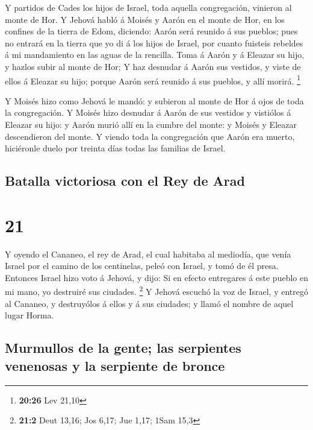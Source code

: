 Y partidos de Cades los hijos de Israel, toda aquella
congregación, vinieron al monte de Hor.  Y Jehová habló á
Moisés y Aarón en el monte de Hor, en los confines de la tierra de Edom,
diciendo:  Aarón será reunido á sus pueblos; pues no
entrará en la tierra que yo di á los hijos de Israel, por cuanto
fuisteis rebeldes á mi mandamiento en las aguas de la rencilla.
 Toma á Aarón y á Eleazar su hijo, y hazlos subir al
monte de Hor;  Y haz desnudar á Aarón sus vestidos, y
viste de ellos á Eleazar su hijo; porque Aarón será reunido á sus
pueblos, y allí morirá. \footnote{\textbf{20:26} Lev 21,10}

 Y Moisés hizo como Jehová le mandó: y subieron al monte
de Hor á ojos de toda la congregación.  Y Moisés hizo
desnudar á Aarón de sus vestidos y vistiólos á Eleazar su hijo: y Aarón
murió allí en la cumbre del monte: y Moisés y Eleazar descendieron del
monte.  Y viendo toda la congregación que Aarón era
muerto, hiciéronle duelo por treinta días todas las familias de Israel.

\hypertarget{batalla-victoriosa-con-el-rey-de-arad}{%
\subsection{Batalla victoriosa con el Rey de
Arad}\label{batalla-victoriosa-con-el-rey-de-arad}}

\hypertarget{section-20}{%
\section{21}\label{section-20}}

 Y oyendo el Cananeo, el rey de Arad, el cual habitaba al
mediodía, que venía Israel por el camino de los centinelas, peleó con
Israel, y tomó de él presa.  Entonces Israel hizo voto á
Jehová, y dijo: Si en efecto entregares á este pueblo en mi mano, yo
destruiré sus ciudades. \footnote{\textbf{21:2} Deut 13,16; Jos 6,17;
  Jue 1,17; 1Sam 15,3}  Y Jehová escuchó la voz de Israel,
y entregó al Cananeo, y destruyólos á ellos y á sus ciudades; y llamó el
nombre de aquel lugar Horma.

\hypertarget{murmullos-de-la-gente-las-serpientes-venenosas-y-la-serpiente-de-bronce}{%
\subsection{Murmullos de la gente; las serpientes venenosas y la
serpiente de
bronce}\label{murmullos-de-la-gente-las-serpientes-venenosas-y-la-serpiente-de-bronce}}


